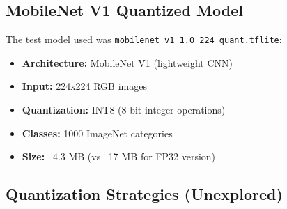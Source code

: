 \documentclass[12pt,a4paper]{report}
\begin{document}
\subsection{MobileNet V1 Quantized Model}

The test model used was \texttt{mobilenet\_v1\_1.0\_224\_quant.tflite}:
\begin{itemize}
    \item \textbf{Architecture:} MobileNet V1 (lightweight CNN)
    \item \textbf{Input:} 224x224 RGB images
    \item \textbf{Quantization:} INT8 (8-bit integer operations)
    \item \textbf{Classes:} 1000 ImageNet categories
    \item \textbf{Size:} ~4.3 MB (vs ~17 MB for FP32 version)
\end{itemize}

\subsection{Quantization Strategies (Unexplored)}
\end{document}

